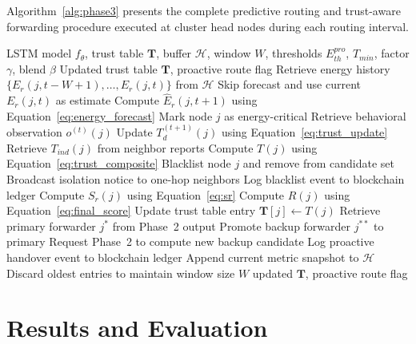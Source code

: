 \documentclass[a4paper,fleqn]{cas-dc}
\numberwithin{equation}{section}
\begin{document}
Algorithm~\ref{alg:phase3} presents the complete predictive routing
and trust-aware forwarding procedure executed at cluster head nodes
during each routing interval.

\begin{algorithm}[htbp]
\small
\caption{Phase 3: LSTM Prediction and Trust-Aware Forwarding}
\label{alg:phase3}
\begin{algorithmic}[1]
\REQUIRE LSTM model $f_\theta$, trust table $\mathbf{T}$,
         buffer $\mathcal{H}$, window $W$,
         thresholds $E_{th}^{pro}$, $T_{min}$,
         factor $\gamma$, blend $\beta$
\ENSURE Updated trust table $\mathbf{T}$, proactive route flag
  \STATE Retrieve energy history
         $\{E_r(j,t-W+1),\ldots,E_r(j,t)\}$ from $\mathcal{H}$
    \STATE Skip forecast and use current $E_r(j,t)$ as estimate
  \ELSE
    \STATE Compute $\hat{E}_r(j,t+1)$ using
           Equation~\ref{eq:energy_forecast}
  \ENDIF
    \STATE Mark node $j$ as energy-critical
  \ENDIF
  \STATE Retrieve behavioral observation $o^{(t)}(j)$
  \STATE Update $T_d^{(t+1)}(j)$ using
         Equation~\ref{eq:trust_update}
  \STATE Retrieve $T_{ind}(j)$ from neighbor reports
  \STATE Compute $T(j)$ using
         Equation~\ref{eq:trust_composite}
    \STATE Blacklist node $j$ and remove from candidate set
    \STATE Broadcast isolation notice to one-hop neighbors
    \STATE Log blacklist event to blockchain ledger
  \ENDIF
  \STATE Compute $S_r(j)$ using Equation~\ref{eq:sr}
  \STATE Compute $R(j)$ using Equation~\ref{eq:final_score}
  \STATE Update trust table entry $\mathbf{T}[j] \leftarrow T(j)$
\ENDFOR
\STATE Retrieve primary forwarder $j^{*}$ from Phase~2 output
  \STATE Promote backup forwarder $j^{**}$ to primary
  \STATE Request Phase~2 to compute new backup candidate
  \STATE Log proactive handover event to blockchain ledger
\ENDIF
\STATE Append current metric snapshot to $\mathcal{H}$
  \STATE Discard oldest entries to maintain window size $W$
\ENDIF
\RETURN updated $\mathbf{T}$, proactive route flag
\end{algorithmic}
\end{algorithm}

\section{Results and Evaluation}
\label{sec:results}
\end{document}
